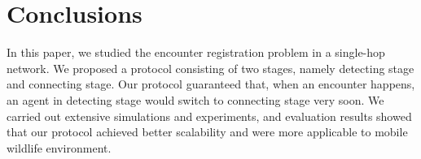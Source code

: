 \section{Conclusions}
\label{sectionconclusion}
\vspace{-0.01in}
In this paper, we studied the encounter registration problem in a single-hop network.
We proposed a protocol consisting of two stages, namely detecting stage and 
connecting stage. Our protocol guaranteed that, when an encounter happens, 
an agent in detecting stage would switch 
to connecting stage very soon. 
We carried out extensive simulations and experiments, and 
evaluation results showed that our protocol achieved 
better scalability and were more applicable to mobile
wildlife environment. 

